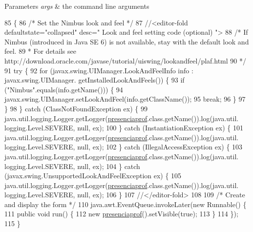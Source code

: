 \begin{DoxyParams}{Parameters}
{\em args} & the command line arguments \\
\hline
\end{DoxyParams}

\begin{DoxyCode}
85                                            \{
86         \textcolor{comment}{/* Set the Nimbus look and feel */}
87         \textcolor{comment}{//<editor-fold defaultstate="collapsed" desc=" Look and feel setting code (optional) ">}
88         \textcolor{comment}{/* If Nimbus (introduced in Java SE 6) is not available, stay with the default look and feel.}
89 \textcolor{comment}{         * For details see http://download.oracle.com/javase/tutorial/uiswing/lookandfeel/plaf.html }
90 \textcolor{comment}{         */}
91         \textcolor{keywordflow}{try} \{
92             \textcolor{keywordflow}{for} (javax.swing.UIManager.LookAndFeelInfo info : javax.swing.UIManager.
      getInstalledLookAndFeels()) \{
93                 \textcolor{keywordflow}{if} (\textcolor{stringliteral}{"Nimbus"}.equals(info.getName())) \{
94                     javax.swing.UIManager.setLookAndFeel(info.getClassName());
95                     \textcolor{keywordflow}{break};
96                 \}
97             \}
98         \} \textcolor{keywordflow}{catch} (ClassNotFoundException ex) \{
99             java.util.logging.Logger.getLogger(\mbox{\hyperlink{classinterfacessoguar_1_1presenciaprof_a9e4f31169325b49b5313434193252dff}{presenciaprof}}.class.getName()).log(java.util.
      logging.Level.SEVERE, null, ex);
100         \} \textcolor{keywordflow}{catch} (InstantiationException ex) \{
101             java.util.logging.Logger.getLogger(\mbox{\hyperlink{classinterfacessoguar_1_1presenciaprof_a9e4f31169325b49b5313434193252dff}{presenciaprof}}.class.getName()).log(java.util.
      logging.Level.SEVERE, null, ex);
102         \} \textcolor{keywordflow}{catch} (IllegalAccessException ex) \{
103             java.util.logging.Logger.getLogger(\mbox{\hyperlink{classinterfacessoguar_1_1presenciaprof_a9e4f31169325b49b5313434193252dff}{presenciaprof}}.class.getName()).log(java.util.
      logging.Level.SEVERE, null, ex);
104         \} \textcolor{keywordflow}{catch} (javax.swing.UnsupportedLookAndFeelException ex) \{
105             java.util.logging.Logger.getLogger(\mbox{\hyperlink{classinterfacessoguar_1_1presenciaprof_a9e4f31169325b49b5313434193252dff}{presenciaprof}}.class.getName()).log(java.util.
      logging.Level.SEVERE, null, ex);
106         \}
107         \textcolor{comment}{//</editor-fold>}
108 
109         \textcolor{comment}{/* Create and display the form */}
110         java.awt.EventQueue.invokeLater(\textcolor{keyword}{new} Runnable() \{
111             \textcolor{keyword}{public} \textcolor{keywordtype}{void} run() \{
112                 \textcolor{keyword}{new} \mbox{\hyperlink{classinterfacessoguar_1_1presenciaprof_a9e4f31169325b49b5313434193252dff}{presenciaprof}}().setVisible(\textcolor{keyword}{true});
113             \}
114         \});
115     \}
\end{DoxyCode}


